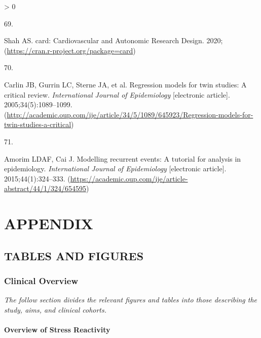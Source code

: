 \documentclass[
  11pt,
  openany]{book}
\newlength{\cslhangindent}
\newlength{\csllabelwidth}
\newenvironment{CSLReferences}[2] %
 {%
  \setlength{\parindent}{0pt}
  \ifodd #1 \everypar{\setlength{\hangindent}{\cslhangindent}}\ignorespaces\fi
  \ifnum #2 > 0
  \setlength{\parskip}{#2\baselineskip}
  \fi
 }%
 {}
\newcommand{\CSLLeftMargin}[1]{\parbox[t]{\csllabelwidth}{#1}}
\newcommand{\CSLRightInline}[1]{\parbox[t]{\linewidth - \csllabelwidth}{#1}\break}
\begin{document}
\begin{CSLReferences}{0}{0}
\leavevmode\hypertarget{ref-Shah2020d}{}%
\CSLLeftMargin{69. }
\CSLRightInline{Shah AS. {card: Cardiovascular and Autonomic Research Design}. 2020;(\url{https://cran.r-project.org/package=card})}

\leavevmode\hypertarget{ref-Carlin2005a}{}%
\CSLLeftMargin{70. }
\CSLRightInline{Carlin JB, Gurrin LC, Sterne JA, et al. {Regression models for twin studies: A critical review}. \emph{International Journal of Epidemiology} {[}electronic article{]}. 2005;34(5):1089--1099. (\url{http://academic.oup.com/ije/article/34/5/1089/645923/Regression-models-for-twin-studies-a-critical})}

\leavevmode\hypertarget{ref-Amorim2015a}{}%
\CSLLeftMargin{71. }
\CSLRightInline{Amorim LDAF, Cai J. {Modelling recurrent events: A tutorial for analysis in epidemiology}. \emph{International Journal of Epidemiology} {[}electronic article{]}. 2015;44(1):324--333. (\url{https://academic.oup.com/ije/article-abstract/44/1/324/654595})}

\end{CSLReferences}

\egroup

\hypertarget{part-appendix}{%
\part*{APPENDIX}\label{part-appendix}}

\hypertarget{appendix-appendix}{%
\appendix}


\hypertarget{tables-and-figures}{%
\chapter{TABLES AND FIGURES}\label{tables-and-figures}}

\bgroup
\singlespacing

\hypertarget{clinical-overview}{%
\section{Clinical Overview}\label{clinical-overview}}

\emph{The follow section divides the relevant figures and tables into those describing the study, aims, and clinical cohorts.}

\newpage

\hypertarget{FigureDag}{%
\subsection{Overview of Stress Reactivity}\label{FigureDag}}
\end{document}
